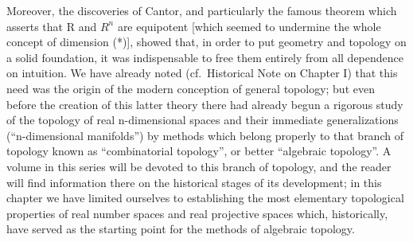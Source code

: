 Moreover, the discoveries of Cantor, and particularly the famous theorem which asserts that R and \(R^{n}\) are equipotent {[}which seemed to undermine the whole concept of dimension (*){]}, showed that, in order to put geometry and topology on a solid foundation, it was indispensable to free them entirely from all dependence on intuition. We have already noted (cf.~Historical Note on Chapter I) that this need was the origin of the modern conception of general topology; but even before the creation of this latter theory there had already begun a rigorous study of the topology of real n-dimensional spaces and their immediate generalizations (``n-dimensional manifolds'') by methods which belong properly to that branch of topology known as ``combinatorial topology'', or better ``algebraic topology''. A volume in this series will be devoted to this branch of topology, and the reader will find information there on the historical stages of its development; in this chapter we have limited ourselves to establishing the most elementary topological properties of real number spaces and real projective spaces which, historically, have served as the starting point for the methods of algebraic topology.


